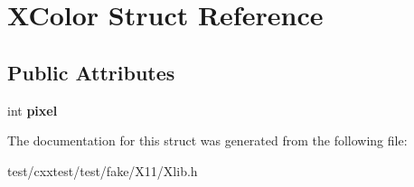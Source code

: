 \hypertarget{structXColor}{\section{X\-Color Struct Reference}
\label{structXColor}
}
\subsection*{Public Attributes}
\begin{DoxyCompactItemize}
\item 
\hypertarget{structXColor_ac0973ce6aaa6d1d0743f0cb96f3c99ec}{int {\bfseries pixel}}\label{structXColor_ac0973ce6aaa6d1d0743f0cb96f3c99ec}

\end{DoxyCompactItemize}


The documentation for this struct was generated from the following file\-:\begin{DoxyCompactItemize}
\item 
test/cxxtest/test/fake/\-X11/Xlib.\-h\end{DoxyCompactItemize}
